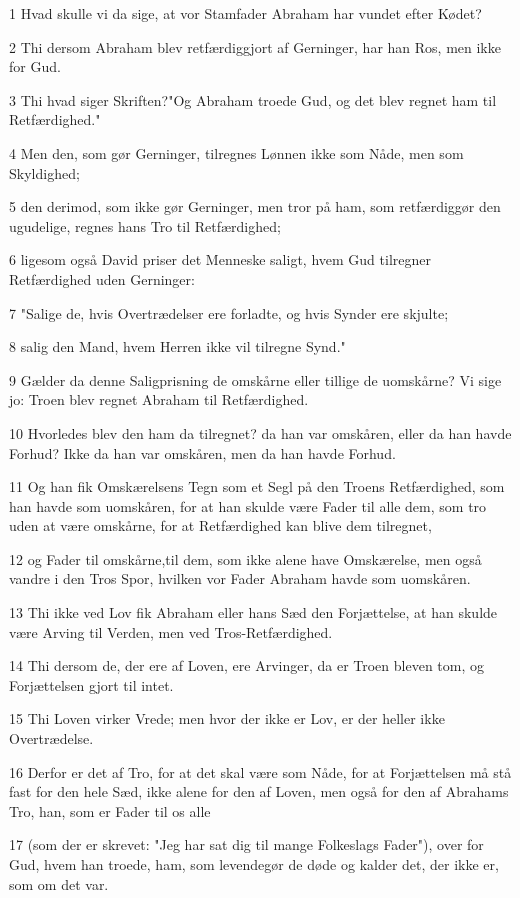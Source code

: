 \par 1 Hvad skulle vi da sige, at vor Stamfader Abraham har vundet efter Kødet?
\par 2 Thi dersom Abraham blev retfærdiggjort af Gerninger, har han Ros, men ikke for Gud.
\par 3 Thi hvad siger Skriften?"Og Abraham troede Gud, og det blev regnet ham til Retfærdighed."
\par 4 Men den, som gør Gerninger, tilregnes Lønnen ikke som Nåde, men som Skyldighed;
\par 5 den derimod, som ikke gør Gerninger, men tror på ham, som retfærdiggør den ugudelige, regnes hans Tro til Retfærdighed;
\par 6 ligesom også David priser det Menneske saligt, hvem Gud tilregner Retfærdighed uden Gerninger:
\par 7 "Salige de, hvis Overtrædelser ere forladte, og hvis Synder ere skjulte;
\par 8 salig den Mand, hvem Herren ikke vil tilregne Synd."
\par 9 Gælder da denne Saligprisning de omskårne eller tillige de uomskårne? Vi sige jo: Troen blev regnet Abraham til Retfærdighed.
\par 10 Hvorledes blev den ham da tilregnet? da han var omskåren, eller da han havde Forhud? Ikke da han var omskåren, men da han havde Forhud.
\par 11 Og han fik Omskærelsens Tegn som et Segl på den Troens Retfærdighed, som han havde som uomskåren, for at han skulde være Fader til alle dem, som tro uden at være omskårne, for at Retfærdighed kan blive dem tilregnet,
\par 12 og Fader til omskårne,til dem, som ikke alene have Omskærelse, men også vandre i den Tros Spor, hvilken vor Fader Abraham havde som uomskåren.
\par 13 Thi ikke ved Lov fik Abraham eller hans Sæd den Forjættelse, at han skulde være Arving til Verden, men ved Tros-Retfærdighed.
\par 14 Thi dersom de, der ere af Loven, ere Arvinger, da er Troen bleven tom, og Forjættelsen gjort til intet.
\par 15 Thi Loven virker Vrede; men hvor der ikke er Lov, er der heller ikke Overtrædelse.
\par 16 Derfor er det af Tro, for at det skal være som Nåde, for at Forjættelsen må stå fast for den hele Sæd, ikke alene for den af Loven, men også for den af Abrahams Tro, han, som er Fader til os alle
\par 17 (som der er skrevet: "Jeg har sat dig til mange Folkeslags Fader"), over for Gud, hvem han troede, ham, som levendegør de døde og kalder det, der ikke er, som om det var.
